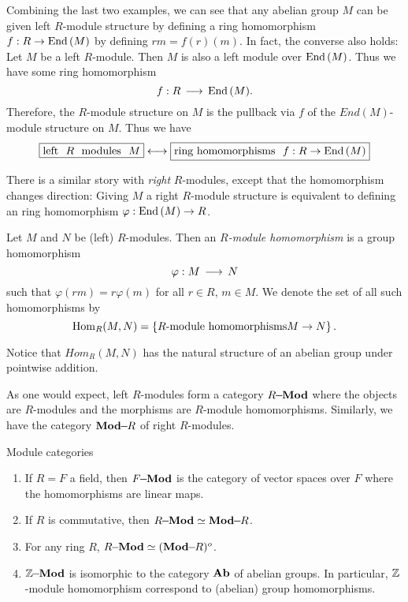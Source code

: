 Combining the last two examples, we can see that any abelian group $M$ can be given left $R$-module structure by defining a ring homomorphism $f : R \to \mathrm{End}\,(M)$ by defining $rm = f(r)(m)$. In fact, the converse also holds: Let $M$ be a left $R$-module. Then $M$ is also a left module over $\mathrm{End}\,(M)$. Thus we have some ring homomorphism
\[
f : R \,\longrightarrow\, \mathrm{End}\,(M).
\]
Therefore, the $R$-module structure on $M$ is the pullback via $f$ of the $End(M)$-module structure on $M$. Thus we have
\[
\fbox{\text{left } $R$ \text{ modules } $M$} \longleftrightarrow \fbox{\text{ring homomorphisms } $f : R \to \mathrm{End}\,(M)$}
\]

There is a similar story with \emph{right} $R$-modules, except that the homomorphism changes direction: Giving $M$ a right $R$-module structure is equivalent to defining an ring homomorphism $\varphi : \mathrm{End}\,(M) \to R$.

\begin{dfn}
  Let $M$ and $N$ be (left) $R$-modules. Then an \emph{$R$-module homomorphism} is a group homomorphism
  \[
  \varphi : M \,\longrightarrow\, N
  \]
  such that $\varphi(rm) = r \varphi(m)$ for all $r \in R$, $m \in M$. We denote the set of all such homomorphisms by
  \[
  \mathrm{Hom}_R(M,N) = \left\{R\text{-module homomorphisms} M \to N\right\}.
  \]
\end{dfn}

Notice that $Hom_R(M,N)$ has the natural structure of an abelian group under pointwise addition. 

As one would expect, left $R$-modules form a category $R\!\!-\!\!\mathbf{Mod}$ where the objects are $R$-modules and the morphisms are $R$-module homomorphisms. Similarly, we have the category $\mathbf{Mod}\!\!-\!\!R$ of right $R$-modules.

\begin{eg}
  Module categories
  \begin{enumerate}
  \item If $R = F$ a field, then $F\!\!-\!\!\mathbf{Mod}$ is the category of vector spaces over $F$ where the homomorphisms are linear maps.
  \item If $R$ is commutative, then $\Mod R \simeq \rMod R$.
  \item For any ring $R$, $\Mod R \simeq (\rMod R)^{o}$.
  \item $\mathbb{Z}\!\!-\!\!\mathbf{Mod}$ is isomorphic to the category $\mathbf{Ab}$ of abelian groups. In particular, $\mathbb{Z}$-module homomorphism correspond to (abelian) group homomorphisms.
  \end{enumerate}
\end{eg}

